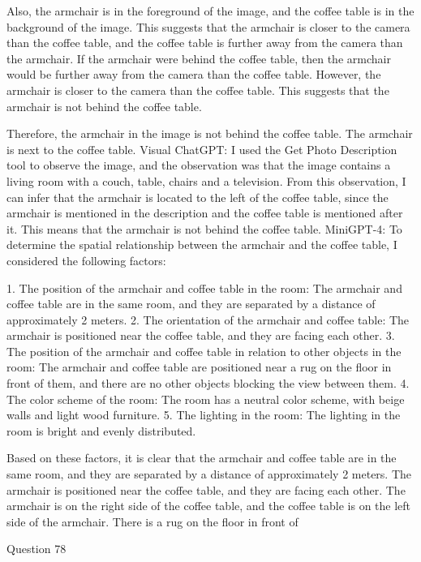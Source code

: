 \begin{enumerate}
    Also, the armchair is in the foreground of the image, and the coffee table is in the background of the image. This suggests that the armchair is closer to the camera than the coffee table, and the coffee table is further away from the camera than the armchair. If the armchair were behind the coffee table, then the armchair would be further away from the camera than the coffee table. However, the armchair is closer to the camera than the coffee table. This suggests that the armchair is not behind the coffee table.
    
    Therefore, the armchair in the image is not behind the coffee table. The armchair is next to the coffee table.
    \subitem Visual ChatGPT: I used the Get Photo Description tool to observe the image, and the observation was that the image contains a living room with a couch, table, chairs and a television. From this observation, I can infer that the armchair is located to the left of the coffee table, since the armchair is mentioned in the description and the coffee table is mentioned after it. This means that the armchair is not behind the coffee table.
    \subitem MiniGPT-4: To determine the spatial relationship between the armchair and the coffee table, I considered the following factors:

    1. The position of the armchair and coffee table in the room: The armchair and coffee table are in the same room, and they are separated by a distance of approximately 2 meters.
    2. The orientation of the armchair and coffee table: The armchair is positioned near the coffee table, and they are facing each other.
    3. The position of the armchair and coffee table in relation to other objects in the room: The armchair and coffee table are positioned near a rug on the floor in front of them, and there are no other objects blocking the view between them.
    4. The color scheme of the room: The room has a neutral color scheme, with beige walls and light wood furniture.
    5. The lighting in the room: The lighting in the room is bright and evenly distributed.
    
    Based on these factors, it is clear that the armchair and coffee table are in the same room, and they are separated by a distance of approximately 2 meters. The armchair is positioned near the coffee table, and they are facing each other. The armchair is on the right side of the coffee table, and the coffee table is on the left side of the armchair. There is a rug on the floor in front of
\end{enumerate}
Question 78\\
